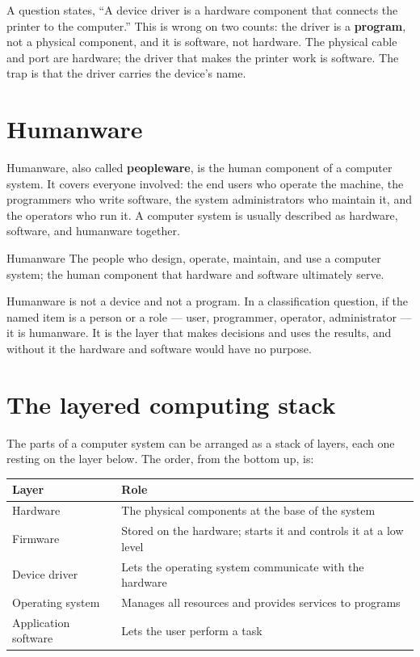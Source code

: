 \begin{example}
A question states, ``A device driver is a hardware component that connects the
printer to the computer.'' This is wrong on two counts: the driver is a
\textbf{program}, not a physical component, and it is software, not hardware.
The physical cable and port are hardware; the driver that makes the printer
work is software. The trap is that the driver carries the device's name.
\end{example}

\section{Humanware}
Humanware, also called \textbf{peopleware}, is the human component of a
computer system. It covers everyone involved: the end users who operate the
machine, the programmers who write software, the system administrators who
maintain it, and the operators who run it. A computer system is usually
described as hardware, software, and humanware together.

\begin{definitionbox}{Humanware}
The people who design, operate, maintain, and use a computer system; the human
component that hardware and software ultimately serve.
\end{definitionbox}

Humanware is not a device and not a program. In a classification question, if
the named item is a person or a role --- user, programmer, operator,
administrator --- it is humanware. It is the layer that makes decisions and
uses the results, and without it the hardware and software would have no
purpose.

\section{The layered computing stack}
The parts of a computer system can be arranged as a stack of layers, each one
resting on the layer below. The order, from the bottom up, is:

\begin{center}
\begin{tabular}{p{}p{}}
\toprule
\textbf{Layer} & \textbf{Role} \\
\midrule
Hardware & The physical components at the base of the system \\
Firmware & Stored on the hardware; starts it and controls it at a low level \\
Device driver & Lets the operating system communicate with the hardware \\
Operating system & Manages all resources and provides services to programs \\
Application software & Lets the user perform a task \\
\bottomrule
\end{tabular}
\end{center}

